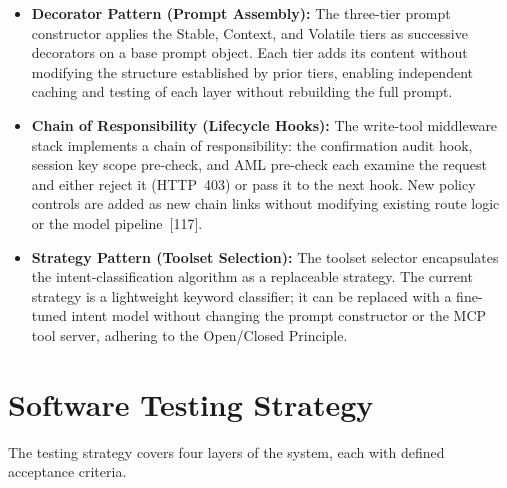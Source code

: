 \documentclass[12pt,a4paper]{report}
\begin{document}
\begin{itemize}[noitemsep]
\item \textbf{Decorator Pattern (Prompt Assembly):} The three-tier prompt
constructor applies the Stable, Context, and Volatile tiers as successive
decorators on a base prompt object. Each tier adds its content without modifying
the structure established by prior tiers, enabling independent caching and testing
of each layer without rebuilding the full prompt.

\item \textbf{Chain of Responsibility (Lifecycle Hooks):} The write-tool middleware
stack implements a chain of responsibility: the confirmation audit hook, session
key scope pre-check, and AML pre-check each examine the request and either reject
it (HTTP~403) or pass it to the next hook. New policy controls are added as new
chain links without modifying existing route logic or the model
pipeline~[117].

\item \textbf{Strategy Pattern (Toolset Selection):} The toolset selector
encapsulates the intent-classification algorithm as a replaceable strategy. The
current strategy is a lightweight keyword classifier; it can be replaced with a
fine-tuned intent model without changing the prompt constructor or the MCP tool
server, adhering to the Open/Closed Principle.
\end{itemize}


\section{Software Testing Strategy}

The testing strategy covers four layers of the system, each with defined acceptance criteria.
\end{document}
